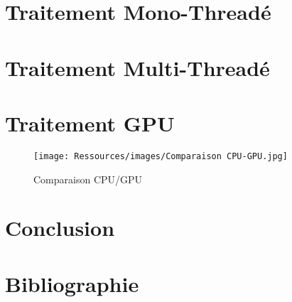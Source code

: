 \documentclass[12pt,a4paper]{article}
\begin{document}

\section{Traitement Mono-Threadé}



\section{Traitement Multi-Threadé}


\section{Traitement GPU}

\begin{figure}[h]
    \centering
    \texttt{[image: Ressources/images/Comparaison CPU-GPU.jpg]}
    \caption{Comparaison CPU/GPU}
    \label{fig:cpu/gpu}
\end{figure}

\section{Conclusion}

\newpage
\section{Bibliographie}



\end{document}
